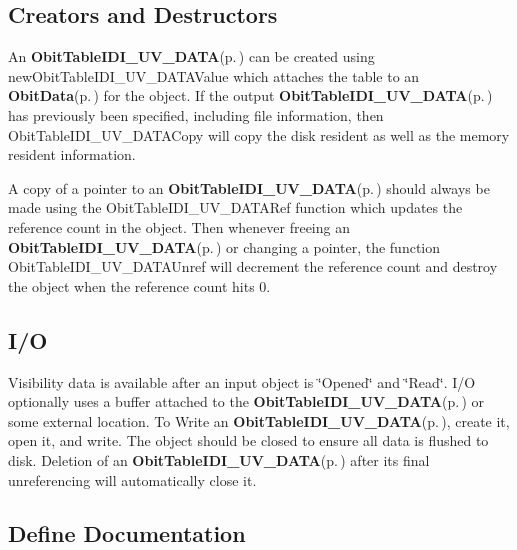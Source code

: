 \subsection{Creators and Destructors}\label{ObitTableIDI__UV__DATA_8h_ObitTableIDI_UV_DATAaccess}
An {\bf Obit\-Table\-IDI\_\-UV\_\-DATA}{\rm (p.\,\pageref{structObitTableIDI__UV__DATA})} can be created using new\-Obit\-Table\-IDI\_\-UV\_\-DATAValue which attaches the table to an {\bf Obit\-Data}{\rm (p.\,\pageref{structObitData})} for the object. If the output {\bf Obit\-Table\-IDI\_\-UV\_\-DATA}{\rm (p.\,\pageref{structObitTableIDI__UV__DATA})} has previously been specified, including file information, then Obit\-Table\-IDI\_\-UV\_\-DATACopy will copy the disk resident as well as the memory resident information.

A copy of a pointer to an {\bf Obit\-Table\-IDI\_\-UV\_\-DATA}{\rm (p.\,\pageref{structObitTableIDI__UV__DATA})} should always be made using the Obit\-Table\-IDI\_\-UV\_\-DATARef function which updates the reference count in the object. Then whenever freeing an {\bf Obit\-Table\-IDI\_\-UV\_\-DATA}{\rm (p.\,\pageref{structObitTableIDI__UV__DATA})} or changing a pointer, the function Obit\-Table\-IDI\_\-UV\_\-DATAUnref will decrement the reference count and destroy the object when the reference count hits 0.\subsection{I/O}\label{ObitTableIDI__UV__DATA_8h_ObitTableIDI_UV_DATAUsage}
Visibility data is available after an input object is \char`\"{}Opened\char`\"{} and \char`\"{}Read\char`\"{}. I/O optionally uses a buffer attached to the {\bf Obit\-Table\-IDI\_\-UV\_\-DATA}{\rm (p.\,\pageref{structObitTableIDI__UV__DATA})} or some external location. To Write an {\bf Obit\-Table\-IDI\_\-UV\_\-DATA}{\rm (p.\,\pageref{structObitTableIDI__UV__DATA})}, create it, open it, and write. The object should be closed to ensure all data is flushed to disk. Deletion of an {\bf Obit\-Table\-IDI\_\-UV\_\-DATA}{\rm (p.\,\pageref{structObitTableIDI__UV__DATA})} after its final unreferencing will automatically close it.

\subsection{Define Documentation}
